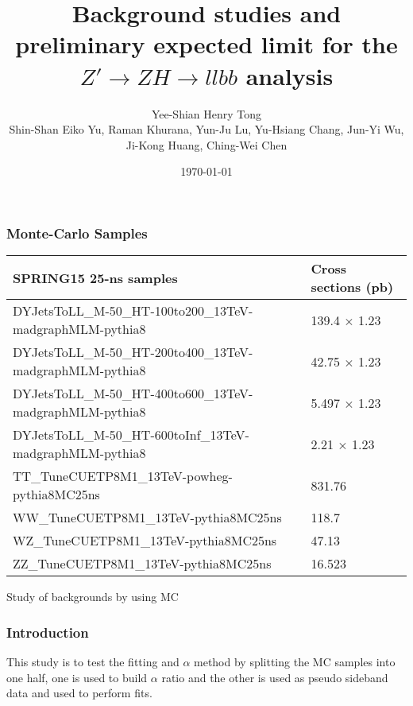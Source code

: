 \documentclass[aspectratio=169]{beamer}
\title[]{\LARGE{Background studies and preliminary expected limit for the $Z' \rightarrow ZH \rightarrow llbb$ analysis}} %
\author[Henry Tong]{\Large{Yee-Shian Henry Tong}\\[3mm] \scriptsize{Shin-Shan Eiko Yu, Raman Khurana, Yun-Ju Lu, Yu-Hsiang Chang, Jun-Yi Wu, Ji-Kong Huang, Ching-Wei Chen}} %
\institute[NCU]{ %
  National Central University \\ %
  \medskip
  \textit{Dibosons Resonance Meeting}
}
\date{\today} %
\begin{document}
\begin{frame}
  \vspace*{-1cm}
  \enlargethispage{1cm}
  \titlepage %
\end{frame}
\everymath{\displaystyle}
\renewcommand{\arraystretch}{1.3}
\begin{frame}
  \frametitle{Monte-Carlo Samples}
  \justifying 
  \begin{tiny}
    \begin{center}
      \begin{tabular}{ | l | l | }
        \hline
        \bf SPRING15 25-ns samples & \bf Cross sections (pb) \\
        \hline
        DYJetsToLL\_M-50\_HT-100to200\_13TeV-madgraphMLM-pythia8
        & 139.4 $\times$ 1.23  \\
        \hline
        DYJetsToLL\_M-50\_HT-200to400\_13TeV-madgraphMLM-pythia8
        & 42.75 $\times$ 1.23  \\
        \hline
        DYJetsToLL\_M-50\_HT-400to600\_13TeV-madgraphMLM-pythia8
        & 5.497 $\times$ 1.23  \\
        \hline
        DYJetsToLL\_M-50\_HT-600toInf\_13TeV-madgraphMLM-pythia8
        & 2.21 $\times$ 1.23   \\
        \hline  
        TT\_TuneCUETP8M1\_13TeV-powheg-pythia8MC25ns
        & 831.76      \\
        \hline
        WW\_TuneCUETP8M1\_13TeV-pythia8MC25ns 
        & 118.7       \\
        \hline
        WZ\_TuneCUETP8M1\_13TeV-pythia8MC25ns 
        & 47.13       \\
        \hline
        ZZ\_TuneCUETP8M1\_13TeV-pythia8MC25ns 
        & 16.523      \\
        \hline
      \end{tabular}
    \end{center}
  \end{tiny}
\end{frame}
\begin{frame}
  \LARGE{\centerline{Study of backgrounds by using MC}}
\end{frame}
\begin{frame}
  \frametitle{Introduction}
  \justifying
  \begin{footnotesize}
    This study is to test the fitting and $\alpha$ method by splitting the MC samples into one half, one is used to build $\alpha$ ratio and the other is used as
    pseudo sideband data and used to perform fits.
  \end{footnotesize}
\end{frame}
\end{document}
